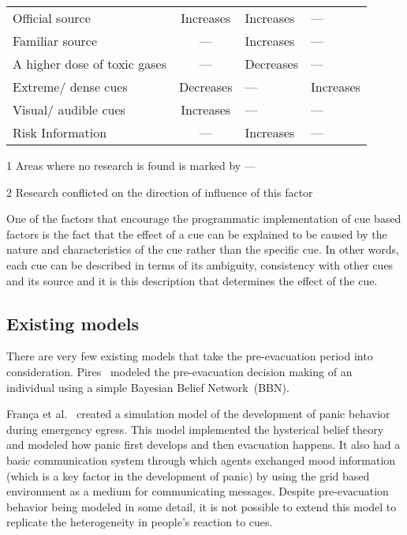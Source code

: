 \begin{table}[htbp]
\begin{threeparttable}[b]
\begin{tabular}{m{6.3cm} c >{\centering\arraybackslash}m{2.8cm} >{\centering\arraybackslash}m{2.8cm}}
Official source & Increases & Increases &---\\
Familiar source & --- & Increases &--- \\
A higher dose of toxic gases & --- & Decreases & --- \\
Extreme/ dense cues & Decreases & --- & Increases \\
Visual/ audible cues & Increases & --- & --- \\
Risk Information & --- & Increases & --- \\
\bottomrule
\end{tabular}
\begin{tablenotes}
\item[1]{Areas where no research is found is marked by ---}
\item[2]{Research conflicted on the direction of influence of this factor}
\end{tablenotes}
\label{tab:Cues}
\end{threeparttable}
\end{table}



One of the factors that encourage the programmatic implementation of cue based factors is the fact that the effect of a cue can be explained to be caused by the nature and characteristics of the cue rather than the specific cue. In other words, each cue can be described in terms of its ambiguity, consistency with other cues and its source and it is this description that determines the effect of the cue.


\subsection{Existing models}
\label{PreEvac:ExistingModels}

There are very few existing models that take the pre-evacuation period into consideration. Pires~\cite{Pires:2005gs}  modeled the pre-evacuation decision making of an individual using a simple Bayesian Belief Network~(BBN).

Fran{\c c}a et al.~\cite{Franca:2009wq} created a simulation model of the development of panic behavior during emergency egress. This model implemented the hysterical belief theory~\cite{Torres:2010tj} and modeled how panic first develops and then evacuation happens. It also had a basic communication system through which agents exchanged mood information (which is a key factor in the development of panic) by using the grid based environment as a medium for communicating messages. Despite pre-evacuation behavior being modeled in some detail, it is not possible to extend this model to replicate the heterogeneity in people's reaction to cues.

